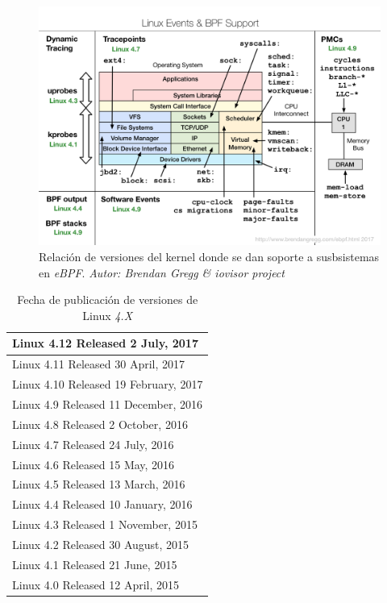 \begin{figure}[h]
  \centering
    \includegraphics[scale=0.65]{images/linux_ebpf_support}
  \caption{Relación de versiones del kernel donde se dan soporte a susbsistemas en \emph{eBPF}. \emph{Autor: Brendan Gregg \& iovisor project}}
  \label{fig:linux_ebpf_support}
\end{figure}

\begin{table}[h]
\centering
\begin{tabular}[!h]{|l|}
\hline
Linux 4.12 Released 2 July, 2017 \\
\hline
Linux 4.11 Released 30 April, 2017 \\
\hline
Linux 4.10 Released 19 February, 2017 \\
\hline
Linux 4.9 Released 11 December, 2016 \\
\hline
Linux 4.8 Released 2 October, 2016 \\
\hline
Linux 4.7 Released 24 July, 2016 \\
\hline
Linux 4.6 Released 15 May, 2016 \\
\hline
Linux 4.5 Released 13 March, 2016 \\
\hline
Linux 4.4 Released 10 January, 2016 \\
\hline
Linux 4.3 Released 1 November, 2015 \\
\hline
Linux 4.2 Released 30 August, 2015 \\
\hline
Linux 4.1 Released 21 June, 2015 \\
\hline
Linux 4.0 Released 12 April, 2015 \\
\hline
\end{tabular}
\caption{\label{tab:linux-release-date}Fecha de publicación de versiones de Linux \emph{4.X}}
\end{table}

